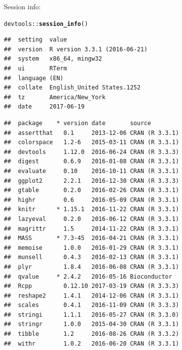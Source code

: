 \documentclass{article}\usepackage[]{graphicx}\usepackage[]{color}
\makeatletter
\newcommand{\hlopt}[1]{\textcolor[rgb]{0,0,0}{#1}}%
\newcommand{\hlstd}[1]{\textcolor[rgb]{0.345,0.345,0.345}{#1}}%
\newcommand{\hlkwd}[1]{\textcolor[rgb]{0.737,0.353,0.396}{\textbf{#1}}}%
\newenvironment{kframe}{%
 \def\at@end@of@kframe{}%
 \ifinner\ifhmode%
  \def\at@end@of@kframe{\end{minipage}}%
  \begin{minipage}{\columnwidth}%
 \fi\fi%
 \def\FrameCommand##1{\hskip\@totalleftmargin \hskip-\fboxsep
 \colorbox{shadecolor}{##1}\hskip-\fboxsep
     \hskip-\linewidth \hskip-\@totalleftmargin \hskip\columnwidth}%
 \MakeFramed {\advance\hsize-\width
   \@totalleftmargin\z@ \linewidth\hsize
   \@setminipage}}%
 {\par\unskip\endMakeFramed%
 \at@end@of@kframe}
\newenvironment{knitrout}{}{} %
\makeatother
\begin{document}
Session info:
\begin{knitrout}
\color{fgcolor}\begin{kframe}
\begin{alltt}
\hlstd{devtools}\hlopt{::}\hlkwd{session_info}\hlstd{()}
\end{alltt}


{\ttfamily\noindent\itshape\color{messagecolor}{\#\# Session info -----------------------------------------------}}\begin{verbatim}
##  setting  value                       
##  version  R version 3.3.1 (2016-06-21)
##  system   x86_64, mingw32             
##  ui       RTerm                       
##  language (EN)                        
##  collate  English_United States.1252  
##  tz       America/New_York            
##  date     2017-06-19
\end{verbatim}


{\ttfamily\noindent\itshape\color{messagecolor}{\#\# Packages ---------------------------------------------------}}\begin{verbatim}
##  package    * version date       source        
##  assertthat   0.1     2013-12-06 CRAN (R 3.3.1)
##  colorspace   1.2-6   2015-03-11 CRAN (R 3.3.1)
##  devtools     1.12.0  2016-06-24 CRAN (R 3.3.3)
##  digest       0.6.9   2016-01-08 CRAN (R 3.3.1)
##  evaluate     0.10    2016-10-11 CRAN (R 3.3.1)
##  ggplot2      2.2.1   2016-12-30 CRAN (R 3.3.3)
##  gtable       0.2.0   2016-02-26 CRAN (R 3.3.1)
##  highr        0.6     2016-05-09 CRAN (R 3.3.1)
##  knitr      * 1.15.1  2016-11-22 CRAN (R 3.3.1)
##  lazyeval     0.2.0   2016-06-12 CRAN (R 3.3.1)
##  magrittr     1.5     2014-11-22 CRAN (R 3.3.1)
##  MASS       * 7.3-45  2016-04-21 CRAN (R 3.3.1)
##  memoise      1.0.0   2016-01-29 CRAN (R 3.3.1)
##  munsell      0.4.3   2016-02-13 CRAN (R 3.3.1)
##  plyr         1.8.4   2016-06-08 CRAN (R 3.3.1)
##  qvalue     * 2.4.2   2016-05-16 Bioconductor  
##  Rcpp         0.12.10 2017-03-19 CRAN (R 3.3.3)
##  reshape2     1.4.1   2014-12-06 CRAN (R 3.3.1)
##  scales       0.4.1   2016-11-09 CRAN (R 3.3.3)
##  stringi      1.1.1   2016-05-27 CRAN (R 3.3.0)
##  stringr      1.0.0   2015-04-30 CRAN (R 3.3.1)
##  tibble       1.2     2016-08-26 CRAN (R 3.3.2)
##  withr        1.0.2   2016-06-20 CRAN (R 3.3.1)
\end{verbatim}
\end{kframe}
\end{knitrout}
\end{document}
